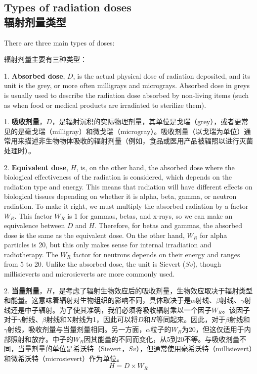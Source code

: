 \documentclass[dvipsnames, svgnames,a4paper,11pt]{article}
\begin{document}
\subsection{Types of radiation doses \\辐射剂量类型}

There are three main types of doses:

辐射剂量主要有三种类型：

1. \textbf{Absorbed dose}, \(D\), is the actual physical dose of radiation deposited, and its unit is the grey, or more often milligrays and micrograys. Absorbed dose in greys is usually used to describe the radiation dose absorbed by non-living items (such as when food or medical products are irradiated to sterilize them).

1. \textbf{吸收剂量}，\(D\)，是辐射沉积的实际物理剂量，其单位是戈瑞（grey），或者更常见的是毫戈瑞（milligray）和微戈瑞（microgray）。吸收剂量（以戈瑞为单位）通常用来描述非生物物体吸收的辐射剂量（例如，食品或医用产品被辐照以进行灭菌处理时）。

2. \textbf{Equivalent dose}, \(H\), is, on the other hand, the absorbed dose where the biological effectiveness of the radiation is considered, which depends on the radiation type and energy. This means that radiation will have different effects on biological tissues depending on whether it is alpha, beta, gamma, or neutron radiation. To make it right, we must multiply the absorbed radiation by a factor \(W_R\). This factor \(W_R\) is 1 for gammas, betas, and x-rays, so we can make an equivalence between \(D\) and \(H\). Therefore, for betas and gammas, the absorbed dose is the same as the equivalent dose. On the other hand, \(W_R\) for alpha particles is 20, but this only makes sense for internal irradiation and radiotherapy. The \(W_R\) factor for neutrons depends on their energy and ranges from 5 to 20. Unlike the absorbed dose, the unit is Sievert (\(Sv\)), though millisieverts and microsieverts are more commonly used.

2. \textbf{当量剂量}，\(H\)，是考虑了辐射生物效应后的吸收剂量，生物效应取决于辐射类型和能量。这意味着辐射对生物组织的影响不同，具体取决于是$\alpha$射线、$\beta$射线、$\gamma$射线还是中子辐射。为了使其准确，我们必须将吸收辐射乘以一个因子\(W_R\)。该因子对于$\gamma$射线、$\beta$射线和X射线为1，因此可以将\(D\)和\(H\)等同起来。因此，对于$\beta$射线和$\gamma$射线，吸收剂量与当量剂量相同。另一方面，$\alpha$粒子的\(W_R\)为20，但这仅适用于内部照射和放疗。中子的\(W_R\)因其能量的不同而变化，从5到20不等。与吸收剂量不同，当量剂量的单位是希沃特（Sievert，\(Sv\)），但通常使用毫希沃特（millisievert）和微希沃特（microsievert）作为单位。
$$H=D \times W_R$$
\end{document}
